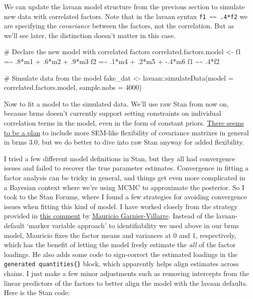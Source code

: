 \documentclass[
  letterpaper,
  DIV=11,
  numbers=noendperiod]{scrreprt}
\newenvironment{Shaded}{\begin{snugshade}}{\end{snugshade}}
\newcommand{\AttributeTok}[1]{\textcolor[rgb]{0.40,0.45,0.13}{#1}}
\newcommand{\CommentTok}[1]{\textcolor[rgb]{0.37,0.37,0.37}{#1}}
\newcommand{\DecValTok}[1]{\textcolor[rgb]{0.68,0.00,0.00}{#1}}
\newcommand{\FunctionTok}[1]{\textcolor[rgb]{0.28,0.35,0.67}{#1}}
\newcommand{\NormalTok}[1]{\textcolor[rgb]{0.00,0.23,0.31}{#1}}
\newcommand{\OtherTok}[1]{\textcolor[rgb]{0.00,0.23,0.31}{#1}}
\newcommand{\SpecialCharTok}[1]{\textcolor[rgb]{0.37,0.37,0.37}{#1}}
\newcommand{\StringTok}[1]{\textcolor[rgb]{0.13,0.47,0.30}{#1}}
\begin{document}
We can update the lavaan model structure from the previous section to
simulate new data with correlated factors. Note that in the lavaan
syntax \texttt{f1\ \textasciitilde{}\textasciitilde{}\ .4*f2} we are
specifying the \emph{covariance} between the factors, not the
correlation. But as we'll see later, the distinction doesn't matter in
this case.

\begin{Shaded}
\begin{Highlighting}[]
\CommentTok{\# Declare the new model with correlated factors}
\NormalTok{correlated.factors.model }\OtherTok{\textless{}{-}} \StringTok{\textquotesingle{} }
\StringTok{  f1 =\textasciitilde{} .8*m1 + .6*m2 + .9*m3}
\StringTok{  f2 =\textasciitilde{} .1*m4 + .2*m5 + {-}.4*m6}
\StringTok{  f1 \textasciitilde{}\textasciitilde{} .4*f2}
\StringTok{\textquotesingle{}}

\CommentTok{\# Simulate data from the model}
\NormalTok{fake\_dat }\OtherTok{\textless{}{-}}\NormalTok{ lavaan}\SpecialCharTok{::}\FunctionTok{simulateData}\NormalTok{(}\AttributeTok{model =}\NormalTok{ correlated.factors.model, }\AttributeTok{sample.nobs =} \DecValTok{4000}\NormalTok{)}
\end{Highlighting}
\end{Shaded}

Now to fit a model to the simulated data. We'll use raw Stan from now
on, because brms doesn't currently support setting constraints on
individual correlation terms in the model, even in the form of constant
priors. \href{https://github.com/paul-buerkner/brms/issues/957}{There
seems to be a plan} to include more SEM-like flexibility of covariance
matrixes in general in brms 3.0, but we do better to dive into raw Stan
anyway for added flexibility.

I tried a few different model definitions in Stan, but they all had
convergence issues and failed to recover the true parameter estimates.
Convergence in fitting a factor analysis can be tricky in general, and
things get even more complicated in a Bayesian context where we're using
MCMC to approximate the posterior. So I took to the Stan Forums, where I
found a few strategies for avoiding convergence issues when fitting this
kind of model. I have worked closely from the strategy provided in
\href{https://discourse.mc-stan.org/t/non-convergence-of-latent-variable-model/12450/13}{this
comment} by
\href{https://research.vu.nl/en/persons/mauricio-garnier-villarreal}{Mauricio
Garnier-Villarre}. Instead of the lavaan-default `marker variable
approach' to identifiability we used above in our brms model, Mauricio
fixes the factor means and variances at 0 and 1, respectively, which has
the benefit of letting the model freely estimate the \emph{all} of the
factor loadings. He also adds some code to sign-correct the estimated
loadings in the \texttt{generated\ quantities\{\}} block, which
apparently helps align estimates across chains. I just make a few minor
adjustments such as removing intercepts from the linear predictors of
the factors to better align the model with the lavaan defaults. Here is
the Stan code:
\end{document}
